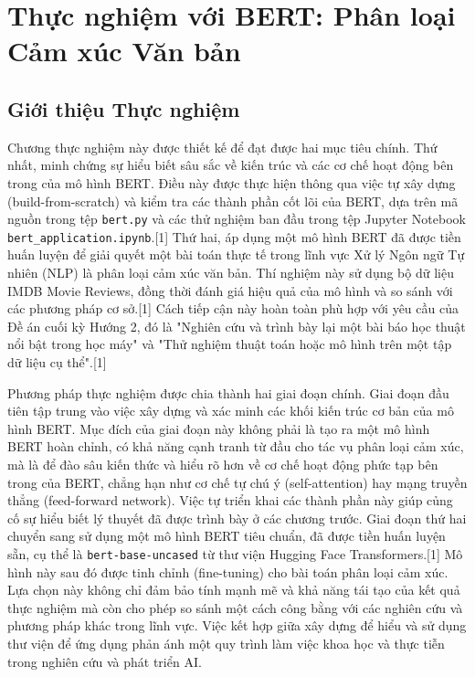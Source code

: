\section{Thực nghiệm với BERT: Phân loại Cảm xúc Văn bản}
\label{sec:thuc_nghiem_bert_rewrite}

\subsection{Giới thiệu Thực nghiệm}
\label{ssec:gioi_thieu_thuc_nghiem_rewrite}
Chương thực nghiệm này được thiết kế để đạt được hai mục tiêu chính. Thứ nhất, minh chứng sự hiểu biết sâu sắc về kiến trúc và các cơ chế hoạt động bên trong của mô hình BERT. Điều này được thực hiện thông qua việc tự xây dựng (build-from-scratch) và kiểm tra các thành phần cốt lõi của BERT, dựa trên mã nguồn trong tệp \texttt{bert.py} và các thử nghiệm ban đầu trong tệp Jupyter Notebook \texttt{bert\_application.ipynb}.[1] Thứ hai, áp dụng một mô hình BERT đã được tiền huấn luyện để giải quyết một bài toán thực tế trong lĩnh vực Xử lý Ngôn ngữ Tự nhiên (NLP) là phân loại cảm xúc văn bản. Thí nghiệm này sử dụng bộ dữ liệu IMDB Movie Reviews, đồng thời đánh giá hiệu quả của mô hình và so sánh với các phương pháp cơ sở.[1] Cách tiếp cận này hoàn toàn phù hợp với yêu cầu của Đề án cuối kỳ Hướng 2, đó là "Nghiên cứu và trình bày lại một bài báo học thuật nổi bật trong học máy" và "Thử nghiệm thuật toán hoặc mô hình trên một tập dữ liệu cụ thể".[1]

Phương pháp thực nghiệm được chia thành hai giai đoạn chính. Giai đoạn đầu tiên tập trung vào việc xây dựng và xác minh các khối kiến trúc cơ bản của mô hình BERT. Mục đích của giai đoạn này không phải là tạo ra một mô hình BERT hoàn chỉnh, có khả năng cạnh tranh từ đầu cho tác vụ phân loại cảm xúc, mà là để đào sâu kiến thức và hiểu rõ hơn về cơ chế hoạt động phức tạp bên trong của BERT, chẳng hạn như cơ chế tự chú ý (self-attention) hay mạng truyền thẳng (feed-forward network). Việc tự triển khai các thành phần này giúp củng cố sự hiểu biết lý thuyết đã được trình bày ở các chương trước. Giai đoạn thứ hai chuyển sang sử dụng một mô hình BERT tiêu chuẩn, đã được tiền huấn luyện sẵn, cụ thể là \texttt{bert-base-uncased} từ thư viện Hugging Face Transformers.[1] Mô hình này sau đó được tinh chỉnh (fine-tuning) cho bài toán phân loại cảm xúc. Lựa chọn này không chỉ đảm bảo tính mạnh mẽ và khả năng tái tạo của kết quả thực nghiệm mà còn cho phép so sánh một cách công bằng với các nghiên cứu và phương pháp khác trong lĩnh vực. Việc kết hợp giữa xây dựng để hiểu và sử dụng thư viện để ứng dụng phản ánh một quy trình làm việc khoa học và thực tiễn trong nghiên cứu và phát triển AI.

